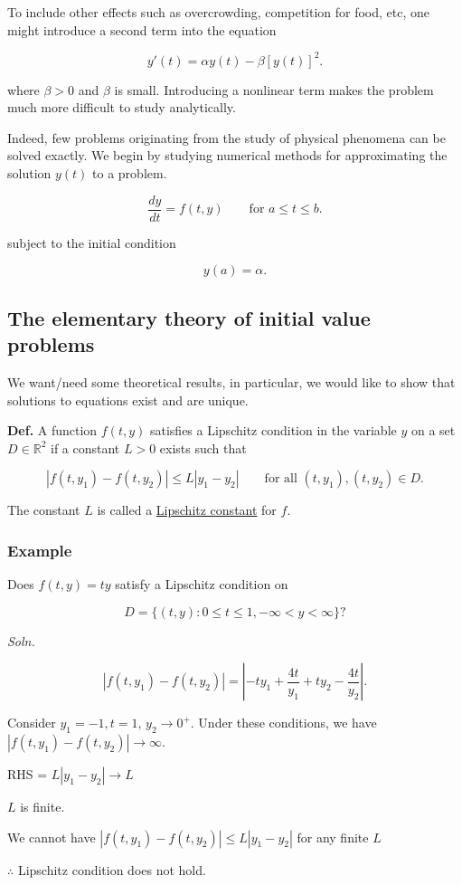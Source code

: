 \documentclass[12pt]{article}
\newcommand{\defn}{\textbf{Def.}\xspace}
\newcommand{\soln}{\textit{Soln.}\xspace}
\begin{document}
To include other effects such as overcrowding, competition for food, etc, one
might introduce a second term into the equation

\begin{equation*}
  y'(t) = \alpha y(t) - \beta [y(t)]^2
.\end{equation*}

where $\beta > 0$ and $\beta$ is small. Introducing a nonlinear term makes the
problem much more difficult to study analytically.

Indeed, few problems originating from the study of physical phenomena can be
solved exactly. We begin by studying numerical methods for approximating the
solution $y(t)$ to a problem.

\[
  \frac{dy}{dt} = f(t, y) \qquad \text{for } a \leq t \leq b
.\]

subject to the initial condition 

\[
y(a) = \alpha
.\]

\subsection{The elementary theory of initial value problems}

We want/need some theoretical results, in particular, we would like to show that
solutions to equations exist and are unique.

\defn A function $f(t,y)$ satisfies a Lipschitz condition in the variable $y$ on
a set $D \in \mathbb{R}^2$ if a constant $L > 0$ exists such that

\[
  |f(t,y_1) - f(t, y_2)| \leq L|y_1 - y_2| \qquad \text{for all } (t,y_1), (t,y_2) \in D
.\]

The constant $L$ is called a \uline{Lipschitz constant} for $f$.

\pagebreak
\subsubsection{Example}

Does $f(t,y) = ty$ satisfy a Lipschitz condition on 

\[
D  = \{(t,y) : 0 \leq t \leq 1, -\infty < y < \infty\}
?\]

\noindent
\soln


\begin{equation*}
|f(t,y_1) - f(t, y_2)| = |-ty_1 + \frac{4t}{y_1} + ty_2 - \frac{4t}{y_2}|
.\end{equation*}


Consider $y_1 = -1, t=1$, $y_2 \to 0^+$. Under these conditions, we have
$|f(t,y_1) - f(t,y_2)| \to \infty$.

RHS = $L|y_1-y_2| \to L$

$L$ is finite.

We cannot have $|f(t,y_1) - f(t,y_2)| \leq L|y_1 - y_2|$ for any finite $L$

$\therefore$ Lipschitz condition does not hold.
\end{document}
